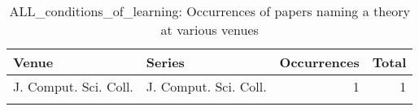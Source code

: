 \begin{table*}[t]
\begin{tabular}{llrr}
Venue & Series & Occurrences & Total\\\hline
\multirow{1}{*}{J. Comput. Sci. Coll.} & J. Comput. Sci. Coll. & 1 & \multirow{1}{*}{1}\\
\caption{ALL_conditions_of_learning: Occurrences of papers naming a theory at various venues}
\end{tabular}
\end{table*}